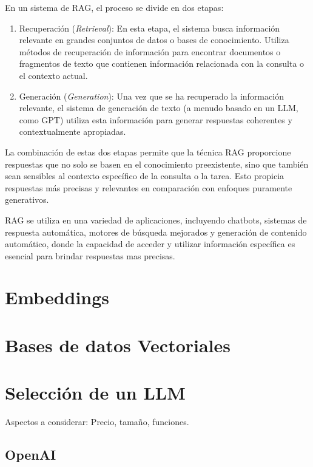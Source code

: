 En un sistema de RAG, el proceso se divide en dos etapas:

\begin{enumerate}
    \item Recuperación (\textit{Retrieval}): En esta etapa, el sistema busca información relevante en grandes conjuntos de datos o bases de conocimiento. Utiliza métodos de recuperación de información para encontrar documentos o fragmentos de texto que contienen información relacionada con la consulta o el contexto actual.

    \item Generación (\textit{Generation}): Una vez que se ha recuperado la información relevante, el sistema de generación de texto (a menudo basado en un LLM, como GPT) utiliza esta información para generar respuestas coherentes y contextualmente apropiadas.
    
\end{enumerate}

La combinación de estas dos etapas permite que la técnica RAG proporcione respuestas que no solo se basen en el conocimiento preexistente\cite{chen-etal-2017-reading}, sino que también sean sensibles al contexto específico de la consulta o la tarea. Esto propicia respuestas más precisas y relevantes en comparación con enfoques puramente generativos\cite{fan-etal-2019-eli5,hossain-etal-2020-simple}.

RAG se utiliza en una variedad de aplicaciones, incluyendo chatbots, sistemas de respuesta automática, motores de búsqueda mejorados y generación de contenido automático, donde la capacidad de acceder y utilizar información específica es esencial para brindar respuestas mas precisas.

\section{Embeddings}

\section{Bases de datos Vectoriales}

\section{Selección de un LLM}

Aspectos a considerar: Precio, tamaño, funciones.

\subsection{OpenAI}

